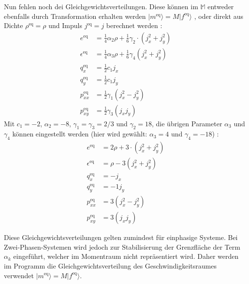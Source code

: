 \documentclass[a4paper,10pt]{scrreprt}
\begin{document}
Nun fehlen noch dei Gleichgewichtsverteilungen. Diese können im $\mathbb{M}$ entweder ebenfalls durch Transformation erhalten werden $|m^{\text{eq}}\rangle = M |f^{\text{eq}}\rangle $ \cite{Yu2010}, oder direkt aus Dichte $\rho^{\text{eq}} = \rho$ und Impuls $j^{\text{eq}} = j$ berechnet werden \cite{Lallemand2000}:
\begin{align}
 e^{\text{eq}} &= \frac{1}{4} \alpha_2 \rho + \frac{1}{6} \gamma_2 \cdot(j_x^2 + j_y^2) \\
 \epsilon^{\text{eq}} &= \frac{1}{4} \alpha_3 \rho + \frac{1}{6} \gamma_4 (j_x^2 + j_y^2) \\
 q_x^{\text{eq}} &= \frac{1}{2} c_1 j_x \\
 q_y^{\text{eq}} &= \frac{1}{2} c_1 j_y \\
 p_{xx}^{\text{eq}} &= \frac{1}{2} \gamma_1 (j_x^2 - j_y^2) \\
 p_{xy}^{\text{eq}} &= \frac{1}{2} \gamma_3 (j_x j_y)
\end{align}
Mit $c_1 = -2$, $\alpha_2 = -8$, $\gamma_1 = \gamma_3 = 2/3$ und $\gamma_2 = 18$, die übrigen Parameter $\alpha_3$ und $\gamma_4$ können eingestellt werden (hier wird gewählt: $\alpha_3 = 4$ und $\gamma_4 = -18$) \cite{Lallemand2000}:
\begin{align}
 e^{\text{eq}} &=  2\rho + 3 \cdot(j_x^2 + j_y^2) \\
 \epsilon^{\text{eq}} &= \rho -3 (j_x^2 + j_y^2) \\
 q_x^{\text{eq}} &= - j_x \\
 q_y^{\text{eq}} &= -1 j_y \\
 p_{xx}^{\text{eq}} &= 3 (j_x^2 - j_y^2) \\
 p_{xy}^{\text{eq}} &= 3 (j_x j_y)
\end{align} 
 
Diese Gleichgewichtsverteilungen gelten zumindest für einphasige Systeme. Bei Zwei-Phasen-Systemen wird jedoch zur Stabilisierung der Grenzfläche der Term $\alpha_k$ eingeführt, welcher im Momentraum nicht repräsentiert wird.
Daher werden im Programm die Gleichgewichtsverteilung des Geschwindigkeitsraumes verwendet $|m^{\text{eq}}\rangle = M |f^{\text{eq}}\rangle $.
\end{document}
